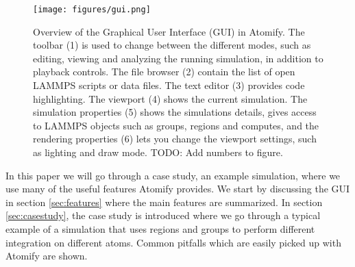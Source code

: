 \documentclass[12pt,a4paper,final]{iopart}
\begin{document}
\begin{figure}
	\centering
	\texttt{[image: figures/gui.png]}
	\caption{%
    Overview of the Graphical User Interface (GUI) in Atomify.
    The toolbar (1) is used to change between the different modes, such as
    editing, viewing and analyzing the running simulation,
    in addition to playback controls.
    The file browser (2) contain the list of open LAMMPS scripts or data files.
    The text editor (3) provides code highlighting.
    The viewport (4) shows the current simulation.
    The simulation properties (5) shows the simulations details, gives access to
    LAMMPS objects such as groups, regions and computes, and the rendering
    properties (6) lets you change the viewport settings, such as lighting and
    draw mode.
    TODO: Add numbers to figure.
    }
	\label{fig:gui}
\end{figure}

In this paper we will go through a case study, an example simulation, where we
use many of the useful features Atomify provides.
We start by discussing the GUI in section \ref{sec:features} where the main features are summarized.
In section \ref{sec:casestudy}, the case study is introduced where we go through a typical example
of a simulation that uses regions and groups to perform different integration on different atoms.
Common pitfalls which are easily picked up with Atomify are shown.
\end{document}
